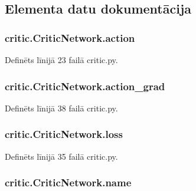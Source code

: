 \subsection{Elementa datu dokumentācija}
\subsubsection[{\texorpdfstring{action}{action}}]{\setlength{\rightskip}{0pt plus 5cm}critic.\+Critic\+Network.\+action}\hypertarget{classcritic_1_1_critic_network_a78b46c2dc517101434ffc7053581f5a6}{}\label{classcritic_1_1_critic_network_a78b46c2dc517101434ffc7053581f5a6}


Definēts līnijā 23 failā critic.\+py.

\subsubsection[{\texorpdfstring{action\+\_\+grad}{action_grad}}]{\setlength{\rightskip}{0pt plus 5cm}critic.\+Critic\+Network.\+action\+\_\+grad}\hypertarget{classcritic_1_1_critic_network_aeec8c7f1d08044b18a6c85868a18174a}{}\label{classcritic_1_1_critic_network_aeec8c7f1d08044b18a6c85868a18174a}


Definēts līnijā 38 failā critic.\+py.

\subsubsection[{\texorpdfstring{loss}{loss}}]{\setlength{\rightskip}{0pt plus 5cm}critic.\+Critic\+Network.\+loss}\hypertarget{classcritic_1_1_critic_network_a720bbce2d663aea7f91ad957a0d24542}{}\label{classcritic_1_1_critic_network_a720bbce2d663aea7f91ad957a0d24542}


Definēts līnijā 35 failā critic.\+py.

\subsubsection[{\texorpdfstring{name}{name}}]{\setlength{\rightskip}{0pt plus 5cm}critic.\+Critic\+Network.\+name}\hypertarget{classcritic_1_1_critic_network_ad7a59dc914d7e6eff3d96c6c819bef38}{}\label{classcritic_1_1_critic_network_ad7a59dc914d7e6eff3d96c6c819bef38}



